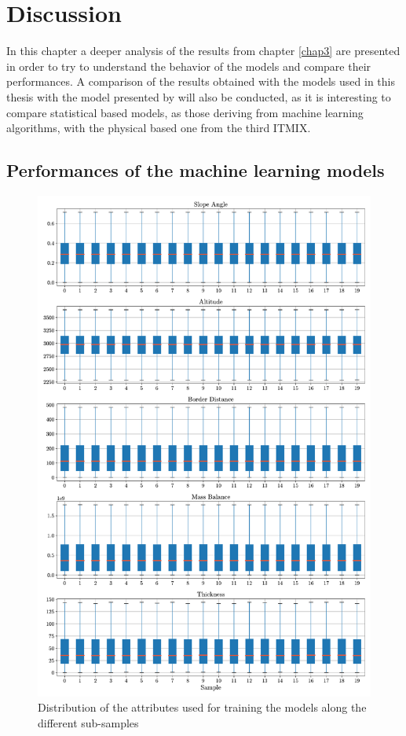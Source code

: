 \chapter{Discussion}\label{disc}
\thispagestyle{plain}
In this chapter a deeper analysis of the results from chapter \ref{chap3} are presented in order to try to understand the behavior of the models and compare their performances. A comparison of the results obtained with the models used in this thesis with the model presented by \cite{Farinotti2019} will also be conducted, as it is interesting to compare statistical based models, as those deriving from machine learning algorithms, with the physical based one from  the third ITMIX.

\section{Performances of the machine learning models}\label{MLcomp}

\begin{figure}[p]
	\centering		  
	\includegraphics[width=1.\textwidth]{figures/samples_distribution.pdf}
	\caption{Distribution of the attributes used for training the models along the different sub-samples}
	\label{fig:distribution}
\end{figure}

